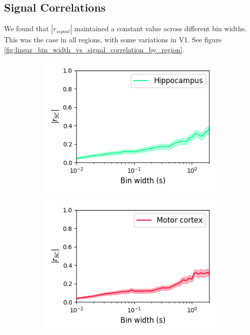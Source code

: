 \documentclass[a4paper,12pt]{article}
\theoremstyle{definition}
\begin{document}
\subsection{Signal Correlations}
We found that $|r_{signal}|$ maintained a constant value across different bin widths. This was the case in all regions, with some variations in V1. See figure \ref{fig:linear_bin_width_vs_signal_correlation_by_region}.

\begin{figure}[p]
  \begin{subfigure}{0.5\textwidth}
    \centering
    \includegraphics[width=\textwidth]{figures/bin_width_correlations_hippocampus_15.png}
  \end{subfigure}
  \begin{subfigure}{0.5\textwidth}
    \centering
    \includegraphics[width=\textwidth]{figures/bin_width_correlations_motor_cortex_15.png}

\end{subfigure}
\end{figure}
\end{document}
